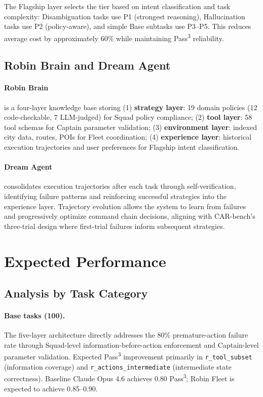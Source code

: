 \documentclass{article}
\begin{document}
The Flagship layer selects the tier based on intent classification and task complexity: Disambiguation tasks use P1 (strongest reasoning), Hallucination tasks use P2 (policy-aware), and simple Base subtasks use P3--P5. This reduces average cost by approximately 60\% while maintaining Pass\textsuperscript{3} reliability.

\subsection{Robin Brain and Dream Agent}

\paragraph{Robin Brain} is a four-layer knowledge base storing (1) \textbf{strategy layer}: 19 domain policies (12 code-checkable, 7 LLM-judged) for Squad policy compliance; (2) \textbf{tool layer}: 58 tool schemas for Captain parameter validation; (3) \textbf{environment layer}: indexed city data, routes, POIs for Fleet coordination; (4) \textbf{experience layer}: historical execution trajectories and user preferences for Flagship intent classification.

\paragraph{Dream Agent} consolidates execution trajectories after each task through self-verification, identifying failure patterns and reinforcing successful strategies into the experience layer. Trajectory evolution allows the system to learn from failures and progressively optimize command chain decisions, aligning with CAR-bench's three-trial design where first-trial failures inform subsequent strategies.

\section{Expected Performance}

\subsection{Analysis by Task Category}

\paragraph{Base tasks (100).} The five-layer architecture directly addresses the 80\% premature-action failure rate through Squad-level information-before-action enforcement and Captain-level parameter validation. Expected Pass\textsuperscript{3} improvement primarily in \texttt{r\_tool\_subset} (information coverage) and \texttt{r\_actions\_intermediate} (intermediate state correctness). Baseline Claude Opus 4.6 achieves 0.80 Pass\textsuperscript{3}; Robin Fleet is expected to achieve 0.85--0.90.
\end{document}
